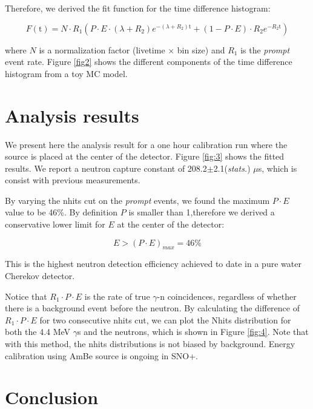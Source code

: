 \documentclass[a4paper]{jpconf}
\begin{document}
Therefore, we derived the fit function for the time difference histogram:

\begin{equation}
F(\textrm{t}) = N \cdot R_{1} (P \cdot E \cdot (\lambda+R_{2}) e^{-(\lambda+R_{2}) \textrm{t}} + (1-P \cdot E) \cdot R_{2} e^{-R_{2} \textrm{t}})
\end{equation}

where $N$ is a normalization factor (livetime $\times$ bin size) and $R_{1}$ is the \textit{prompt} event rate. Figure \ref{fig2} shows the different components of the time difference histogram from a toy MC model.

\section{Analysis results}

We present here the analysis result for a one hour calibration run where the source is placed at the center of the detector. Figure \ref{fig:3} shows the fitted results. We report a neutron capture constant of 208.2$\pm$2.1(\textit{stats.}) $\mu$s, which is consist with previous measurements\cite{}\cite{}\cite{}.

By varying the nhits cut on the \textit{prompt} events, we found the maximum $P \cdot E$ value to be 46\%. By definition $P$ is smaller than 1,therefore we derived a conservative lower limit for $E$ at the center of the detector:

\begin{equation}
E > (P \cdot E)_{max} = 46\%
\end{equation}

This is the highest neutron detection efficiency achieved to date in a pure water Cherekov detector.

Notice that $R_1 \cdot P \cdot E$ is the rate of true $\gamma$-n coincidences, regardless of whether there is a background event before the neutron. By calculating the difference of $R_1 \cdot P \cdot E$ for two consecutive nhits cut, we can plot the Nhits distribution for both the 4.4 MeV $\gamma$s and the neutrons, which is shown in Figure \ref{fig:4}. Note that with this method, the nhits distributions is not biased by background. Energy calibration using AmBe source is ongoing in SNO+.

\section{Conclusion}
\end{document}
